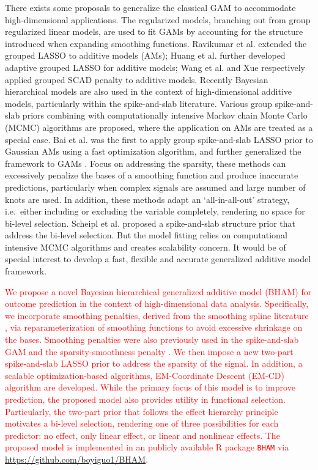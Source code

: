 \documentclass[AMA,STIX1COL,]{WileyNJD-v2}
\begin{document}
There exists some proposals to generalize the classical GAM to
accommodate high-dimensional applications. The regularized models,
branching out from group regularized linear models, are used to fit GAMs
by accounting for the structure introduced when expanding smoothing
functions. Ravikumar et al. \citep{Ravikumar2009} extended the grouped
LASSO \citep{Yuan2006} to additive models (AMs); Huang et al.
\citep{Huang2010} further developed adaptive grouped LASSO for additive
models; Wang et al. \citep{Wang2007} and Xue \citep{Xue2009}
respectively applied grouped SCAD penalty \citep{Fan2001} to additive
models. Recently Bayesian hierarchical models are also used in the
context of high-dimensional additive models, particularly within the
spike-and-slab literature. Various group spike-and-slab priors
\citep{Xu2015, Yang2020} combining with computationally intensive Markov
chain Monte Carlo (MCMC) algorithms are proposed, where the application
on AMs are treated as a special case. Bai et al. \citep{Bai2020} was the
first to apply group spike-and-slab LASSO prior to Gaussian AMs using a
fast optimization algorithm, and further generalized the framework to
GAMs \citep{Bai2021}. Focus on addressing the sparsity, these methods
can excessively penalize the bases of a smoothing function and produce
inaccurate predictions, particularly when complex signals are assumed
and large number of knots are used. \citep{Scheipl2013} In addition,
these methods adapt an `all-in-all-out' strategy, i.e.~either including
or excluding the variable completely, rendering no space for bi-level
selection. Scheipl et al. \citep{Scheipl2012} proposed a spike-and-slab
structure prior that address the bi-level selection. But the model
fitting relies on computational intensive MCMC algorithms and creates
scalability concern. It would be of special interest to develop a fast,
flexible and accurate generalized additive model framework.

\textcolor{red}{We propose a novel Bayesian hierarchical generalized additive model (BHAM) for outcome prediction in the context of high-dimensional data analysis. Specifically, we incorporate smoothing penalties, derived from the smoothing spline literature \cite{Wood2017}, via reparameterization of smoothing functions to avoid excessive shrinkage on the bases. Smoothing penalties were also previously used in the spike-and-slab GAM \cite{Scheipl2012} and the sparsity-smoothness penalty \cite{Meier2009}. We then impose a new two-part spike-and-slab LASSO prior to address the sparsity of the signal. In addition, a scalable optimization-based algorithms, EM-Coordinate Descent (EM-CD) algorithm are developed. While the primary focus of this model is to improve prediction, the proposed model also provides utility in functional selection. Particularly, the two-part prior that follows the effect hierarchy principle motivates a bi-level selection, rendering one of three possibilities for each predictor: no effect, only linear effect, or linear and nonlinear effects. The proposed model is implemented in an publicly available R package \texttt{BHAM} via \url{https://github.com/boyiguo1/BHAM}.}
\end{document}
